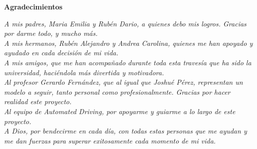 \pagebreak
\thispagestyle{empty}
\begingroup
\vspace*{1,5cm}
\begin{center}
\LARGE\textbf{Agradecimientos}
\end{center}
\small
\vspace*{2cm}



\textit{A mis padres, Maria Emilia y Rubén Dario, a quienes debo mis logros. Gracias por darme todo, y mucho más.}\\

\textit{A mis hermanos, Rubén Alejandro y Andrea Carolina, quienes me han apoyado y ayudado en cada decisión de mi vida.}\\

\textit{A mis amigos, que me han acompañado durante toda esta travesía que ha sido la universidad, haciéndola más divertida y motivadora.}\\

\textit{Al profesor Gerardo Fernández, que al igual que Joshué Pérez, representan un modelo a seguir, tanto personal como profesionalmente. Gracias por hacer realidad este proyecto.}\\

\textit{Al equipo de Automated Driving, por apoyarme y guiarme a lo largo de este proyecto.}\\

\textit{A Dios, por bendecirme en cada día, con todas estas personas que me ayudan y me dan fuerzas para superar exitosamente cada momento de mi vida.}\\


\endgroup



\pagebreak